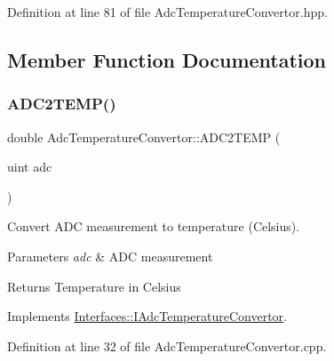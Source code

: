 Definition at line 81 of file Adc\+Temperature\+Convertor.\+hpp.



\subsection{Member Function Documentation}
\mbox{\label{class_adc_temperature_convertor_a3ee4549435400d9ed319fd5fdb83c97f}} 
\subsubsection{\texorpdfstring{A\+D\+C2\+T\+E\+M\+P()}{ADC2TEMP()}}
{\footnotesize\ttfamily double Adc\+Temperature\+Convertor\+::\+A\+D\+C2\+T\+E\+MP (\begin{DoxyParamCaption}\item[{uint}]{adc }\end{DoxyParamCaption})\hspace{0.3cm}{\ttfamily [virtual]}}



Convert A\+DC measurement to temperature (Celsius). 


\begin{DoxyParams}{Parameters}
{\em adc} & A\+DC measurement \\
\hline
\end{DoxyParams}
\begin{DoxyReturn}{Returns}
Temperature in Celsius 
\end{DoxyReturn}


Implements \hyperlink{class_interfaces_1_1_i_adc_temperature_convertor_aa6283c62cbbb012954b5e51d7a969385}{Interfaces\+::\+I\+Adc\+Temperature\+Convertor}.



Definition at line 32 of file Adc\+Temperature\+Convertor.\+cpp.

\mbox{\label{class_adc_temperature_convertor_aeab56811467e8019731f1e2867a76671}} 
